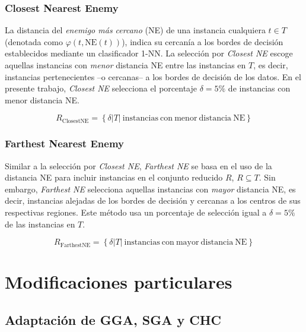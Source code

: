 \subsubsection{Closest Nearest Enemy}

La distancia del \emph{enemigo más cercano} (NE) de una instancia cualquiera $t \in T$ (denotada como $\varphi(t,\mathrm{NE}(t))$), indica su cercanía a los bordes de decisión establecidos mediante un clasificador 1-NN. La selección por \emph{Closest NE} escoge aquellas instancias con \emph{menor} distancia NE entre las instancias en $T$, es decir, instancias pertenecientes --o cercanas-- a los bordes de decisión de los datos. En el presente trabajo, \emph{Closest NE} selecciona el porcentaje $\delta = 5\%$ de instancias con menor distancia NE.

\begin{equation}
R_\mathrm{ClosestNE} = \left\lbrace \delta \vert T \vert\ \mathrm{instancias\ con\ menor\ distancia\ NE} \right\rbrace
\end{equation}

\subsubsection{Farthest Nearest Enemy}

Similar a la selección por \emph{Closest NE}, \emph{Farthest NE} se basa en el uso de la distancia NE para incluir instancias en el conjunto reducido $R$, $R \subseteq T$. Sin embargo, \emph{Farthest NE} selecciona aquellas instancias con \emph{mayor} distancia NE, es decir, instancias alejadas de los bordes de decisión y cercanas a los centros de sus respectivas regiones. Este método usa un porcentaje de selección igual a $\delta = 5\%$ de las instancias en $T$.

\begin{equation}
R_\mathrm{FarthestNE} = \left\lbrace \delta \vert T \vert\ \mathrm{instancias\ con\ mayor\ distancia\ NE} \right\rbrace
\end{equation}

\section{Modificaciones particulares}

\subsection{Adaptación de GGA, SGA y CHC}

